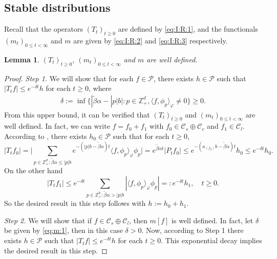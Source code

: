 \documentclass[12pt,a4paper]{amsart}
\theoremstyle{plain}
\newtheorem{lem}[thm]{Lemma}
\theoremstyle{definition}
\numberwithin{equation}{section}
\begin{document}
\subsection{Stable distributions}
\label{sec: stable distributions}
Recall that the operators $(T_t)_{t\geq 0}$ are defined by \eqref{eq:I:R:1}, and the functionals $(m_{t})_{0\leq t< \infty}$ and $m$ are given by \eqref{eq:I:R:2} and \eqref{eq:I:R:3} respectively.
\begin{lem}
  \label{lem:m}
$(T_t)_{t\geq 0}$,  $(m_{t})_{0\leq t< \infty}$ and  $m$ are well defined.
\end{lem}
\begin{proof}
  \emph{Step 1.} We will show that for each $f \in \mathcal P$, there exists $h \in \mathcal P$ such that $ |T_tf| \leq  e^{- \delta t} h$ for each $t\geq 0$, where
  \begin{align}
    \label{eq:m:1}
    \delta
    := \inf \big\{ |\tilde \beta \alpha - |p|b| : p \in \mathbb Z_+^d, \langle f, \phi_p\rangle_\varphi \neq 0 \big\}
    \geq 0.
  \end{align}
  From this upper bound, it can be verified that $(T_t)_{t\geq 0}$ and $(m_{t})_{0 \leq t < \infty}$ are well defined.
  In fact, we can write $f = f_0 + f_1$ with $f_0\in \mathcal C_s \oplus \mathcal C_c$ and $f_1 \in \mathcal C_l$.
  According to \cite[Lemma 2.7]{MarksMilos2018CLT}, there exists $h_0 \in \mathcal P$ such that for each $t\geq 0$,
  \[
    |T_t f_0|
    = \Big| \sum_{p \in  \mathbb Z_+^d: \tilde \beta \alpha \leq |p|b } e^{- ( |p| b - \tilde \beta \alpha ) t} \langle f, \phi_p \rangle_\varphi \phi_p \Big|
    = e^{\tilde \beta \alpha t} | P_t f_0 |
    \leq e^{- ( \kappa_{(f_0)} b - \tilde \beta \alpha) t} h_0
    \leq e^{- \delta t} h_0.
  \]
  On the other hand
  \[
    |T_t f_1|
    \leq e^{- \delta t}\sum_{p \in \mathbb Z_+^d : \tilde \beta \alpha > |p|b} |\langle f, \phi_p \rangle_\varphi \phi_p|
    =: e^{- \delta t} h_1,
    \quad t\geq 0.
  \]
  So the desired result in this step follows with $h := h_0 + h_1$.

  \emph{Step 2.} We will show that if $f \in \mathcal C_s \oplus \mathcal C_l$, then $m[f]$ is well defined.
  In fact, let $\delta$ be given by \eqref{eq:m:1}, then in this case $\delta > 0$.
  Now, according to Step 1 there exists $h \in \mathcal P$ such that $|T_tf| \leq e^{- \delta t} h$ for each $t\geq 0$.
  This exponential decay implies the desired result in this step.


\end{proof}
\end{document}
